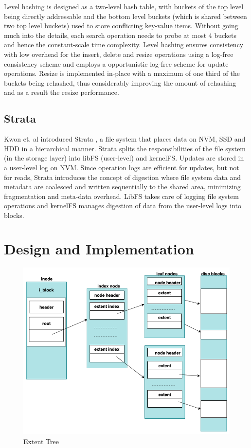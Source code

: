 \documentclass[letterpaper,twocolumn, 11pt]{article}
\begin{document}
Level hashing is designed as a two-level hash table, with buckets of the top level being directly addressable and the bottom level buckets (which is shared between two top level buckets) used to store conflicting key-value items. Without going much into the details, each search operation needs to probe at most 4 buckets and hence the constant-scale time complexity. Level hashing ensures consistency with low overhead for the insert, delete and resize operations using a log-free consistency scheme and employs a opportunistic log-free scheme for update operations. Resize is implemented in-place with a maximum of one third of the buckets being rehashed, thus considerably improving the amount of rehashing and as a result the resize performance.
\vspace{-0.2cm}
\subsection{Strata}
Kwon et. al introduced Strata \cite{strata}, a file system that places data on NVM, SSD and HDD in a hierarchical manner. Strata splits the responsibilities of the file system (in the storage layer) into libFS (user-level) and kernelFS. Updates are stored in a user-level log on NVM. Since operation logs are efficient for updates, but not for reads, Strata introduces the concept of digestion where file system data and metadata are coalesced and written sequentially to the shared area, minimizing fragmentation and meta-data overhead. LibFS takes care of logging file system operations and kernelFS manages digestion of data from the user-level logs into blocks.

\section{Design and Implementation}\label{design}
\begin{figure}[t]
\centering
\includegraphics[width=.40\textwidth]{images/extent_tree-2.png}
\caption{Extent Tree}
\label{fig:extenttree}
\end{figure}
\end{document}
